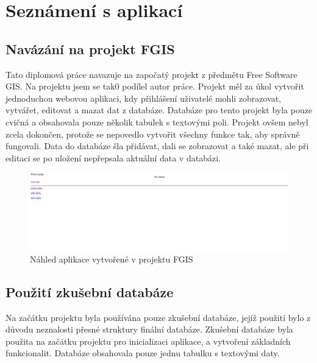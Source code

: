 \chapter{Seznámení s aplikací}
\label{3-seznameni-s-aplikaci}

\section{Navázání na projekt FGIS}

Tato diplomová práce navazuje na započatý projekt z předmětu Free
Software GIS. Na projektu jsem se tak0 podílel autor práce. 
Projekt měl za úkol vytvořit jednoduchou webovou aplikaci, kdy
přihlášení uživatelé mohli zobrazovat, vytvářet, editovat a mazat dat
z databáze. Databáze pro tento projekt byla pouze cvičná a obsahovala
pouze několik tabulek s textovými poli. Projekt ovšem nebyl zcela
dokončen, protože se nepovedlo vytvořit všechny funkce tak, aby
správně fungovali. Data do databáze šla přidávat, dali se zobrazovat a
také mazat, ale při editaci se po uložení nepřepsala aktuální data v
databázi.

\begin{figure}[H] \centering
    \includegraphics[width=400pt]{./pictures/4-nahled-menu-fgis.PNG}
    \caption[Náhled aplikace vytvořené v projektu FGIS]{Náhled aplikace vytvořené v projektu FGIS}
	\label{fig:Náhled aplikace}              
\end{figure}

 \newpage
 
 \section{Použití zkušební databáze}
 
Na začátku projektu byla používána pouze zkušební databáze, jejíž použití 
bylo z důvodu neznalosti přesné struktury finální databáze. Zkušební databáze 
byla použita na začátku projektu pro inicializaci aplikace, a vytvoření základních 
funkcionalit. Databáze obsahovala pouze jednu tabulku s textovými daty.


